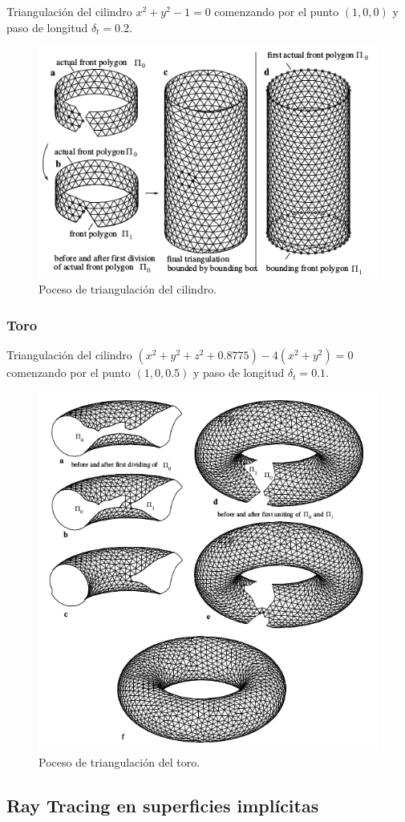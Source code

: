 Triangulación del cilindro $x^2 + y^2 - 1 = 0$ comenzando por el punto $(1,0,0)$ y paso de longitud $\delta_t = 0.2$. 
\[\]
\begin{figure}[h]
\centering
\includegraphics[scale=0.8]{images/hartmann7.png}
\caption{Poceso de triangulación del cilindro.}
\end{figure}

\newpage
\subsubsection{Toro}

Triangulación del cilindro $(x^2+y^2+z^2+0.8775) - 4(x^2+y^2)=0$ comenzando por el punto $(1,0,0.5)$ y paso de longitud $\delta_t = 0.1$.
\[\]

\begin{figure}[h]
\centering
\includegraphics[scale=0.7]{images/hartmann8.png}
\caption{Poceso de triangulación del toro.}
\end{figure}

\subsection{Ray Tracing en superficies implícitas}